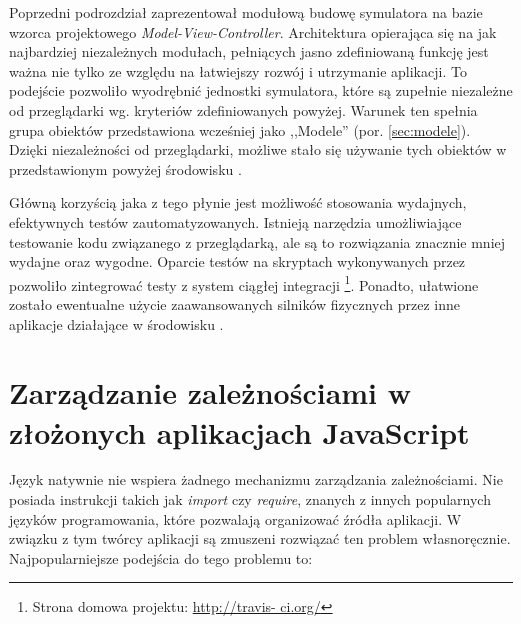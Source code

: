 Poprzedni podrozdział zaprezentował modułową budowę symulatora \en na bazie
wzorca projektowego \emph{Model-View-Controller}. Architektura opierająca  się
na jak najbardziej niezależnych modułach, pełniących jasno zdefiniowaną funkcję
jest ważna nie tylko ze względu na łatwiejszy rozwój i utrzymanie aplikacji. To
podejście pozwoliło wyodrębnić jednostki symulatora, które są zupełnie
niezależne od przeglądarki wg. kryteriów zdefiniowanych powyżej. Warunek ten
spełnia grupa obiektów przedstawiona wcześniej jako ,,Modele'' (por.
\ref{sec:modele}). Dzięki niezależności od przeglądarki, możliwe stało się
używanie tych obiektów w przedstawionym powyżej środowisku .

Główną korzyścią jaka z tego płynie jest możliwość stosowania wydajnych,
efektywnych testów zautomatyzowanych. Istnieją narzędzia umożliwiające
testowanie kodu \js związanego z przeglądarką, ale są to rozwiązania znacznie
mniej wydajne oraz wygodne. Oparcie testów na skryptach wykonywanych przez
 pozwoliło zintegrować testy z system ciągłej integracji \footnote{Strona domowa projektu: \url{http://travis-
ci.org/}}. Ponadto, ułatwione zostało ewentualne użycie zaawansowanych silników
fizycznych \en przez inne aplikacje działające w środowisku .

\section{Zarządzanie zależnościami w złożonych aplikacjach JavaScript}

Język \js natywnie nie wspiera żadnego mechanizmu zarządzania zależnościami. Nie
posiada instrukcji takich jak \emph{import} czy \emph{require}, znanych z innych
popularnych języków programowania, które pozwalają organizować źródła aplikacji.
W związku z tym twórcy aplikacji są zmuszeni rozwiązać ten problem
własnoręcznie. Najpopularniejsze podejścia do tego problemu to:

